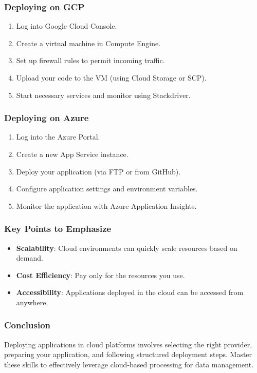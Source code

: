 \documentclass{beamer}
\begin{document}
\begin{frame}
    \frametitle{Deploying on GCP}
    \begin{enumerate}
        \item Log into Google Cloud Console.
        \item Create a virtual machine in Compute Engine.
        \item Set up firewall rules to permit incoming traffic.
        \item Upload your code to the VM (using Cloud Storage or SCP).
        \item Start necessary services and monitor using Stackdriver.
    \end{enumerate}
\end{frame}

\begin{frame}
    \frametitle{Deploying on Azure}
    \begin{enumerate}
        \item Log into the Azure Portal.
        \item Create a new App Service instance.
        \item Deploy your application (via FTP or from GitHub).
        \item Configure application settings and environment variables.
        \item Monitor the application with Azure Application Insights.
    \end{enumerate}
\end{frame}

\begin{frame}
    \frametitle{Key Points to Emphasize}
    \begin{itemize}
        \item \textbf{Scalability}: Cloud environments can quickly scale resources based on demand.
        \item \textbf{Cost Efficiency}: Pay only for the resources you use.
        \item \textbf{Accessibility}: Applications deployed in the cloud can be accessed from anywhere.
    \end{itemize}
\end{frame}

\begin{frame}
    \frametitle{Conclusion}
    Deploying applications in cloud platforms involves selecting the right provider, preparing your application, and following structured deployment steps. Master these skills to effectively leverage cloud-based processing for data management.
\end{frame}
\end{document}

